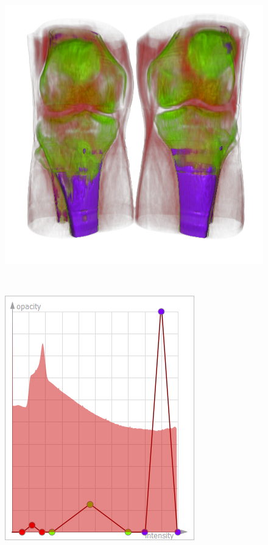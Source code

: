\begin{figure}
\begin{minipage}{.2\textwidth}
		\subcaption{}
	\end{minipage}~
	\begin{minipage}{.29\textwidth}
		\includegraphics[width=1\linewidth]{images/CT-Knee_naive_optimized_linesearch}
		\subcaption{}
	\end{minipage}~
	\begin{minipage}{.2\textwidth}
		\includegraphics[width=1\linewidth]{figures/tf_CT-Knee_naive_optimized_linesearch}
		\subcaption{}
	\end{minipage}
	

\end{figure}
